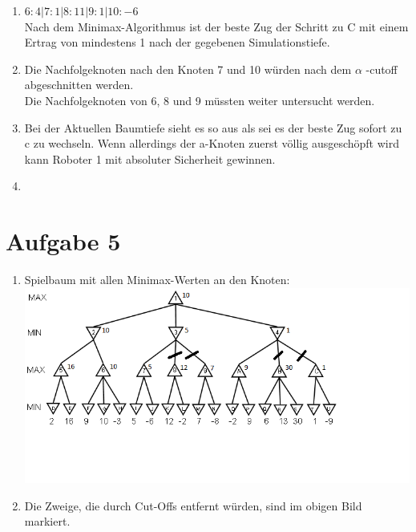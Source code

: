 \documentclass[a4paper,10pt]{article}
\begin{document}
\begin{enumerate}[~~a)]
\begin{enumerate}[1:]
\end{enumerate}

\item

$6: 4 | 7: 1 | 8: 11 | 9: 1 | 10: -6$ \\

Nach dem Minimax-Algorithmus ist der beste Zug der Schritt zu C mit einem Ertrag von mindestens 1 nach der gegebenen Simulationstiefe.

\item

Die Nachfolgeknoten nach den Knoten 7 und 10 würden nach dem $\alpha$ -cutoff abgeschnitten werden. \\
Die Nachfolgeknoten von 6, 8 und 9 müssten weiter untersucht werden.

\item
Bei der Aktuellen Baumtiefe sieht es so aus als sei es der beste Zug sofort zu c zu wechseln. Wenn allerdings der a-Knoten zuerst völlig ausgeschöpft wird kann Roboter 1 mit absoluter Sicherheit gewinnen. 

\item
\end{enumerate}

\section*{Aufgabe 5}
\begin{enumerate}[~~a)]

\item Spielbaum mit allen Minimax-Werten an den Knoten: \\
\includegraphics[scale=1]{Aufgabe5}

\item Die Zweige, die durch Cut-Offs entfernt würden, sind im obigen Bild markiert.

\end{enumerate}
\end{document}
